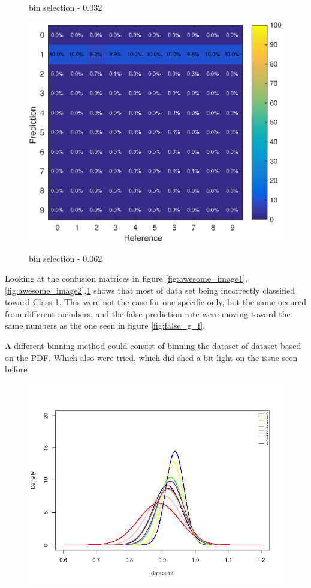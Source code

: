 \documentclass[10pt,a4paper]{article}
\begin{document}
\begin{figure}[!htb]
\label{fig:awesome_image2}
\caption{bin selection - 0.032}
\endminipage\hfill
{}%
  \includegraphics[width=\linewidth]{confus_62.eps}
 \label{fig:awesome_image3}
 \caption{bin selection - 0.062}
\endminipage
\end{figure}

	
Looking at the confusion matrices  in figure \ref{fig:awesome_image1},\ref{fig:awesome_image2},\ref{fig:awesome_image3} shows that most of data set being incorrectly classified toward Class 1. 	This were not the case for one specific only, but the same occured from different members, and the false prediction rate were moving toward the same numbers as the one seen in figure \ref{fig:false_g_f}. 

A different binning method could consist of binning the dataset of dataset based on the PDF.
Which also were tried, which did shed a bit light on the issue seen before 

\begin{figure}[H]
\centering
\includegraphics[width =  \textwidth]{ndist_muld_class.png}
\end{figure} 
\end{document}
